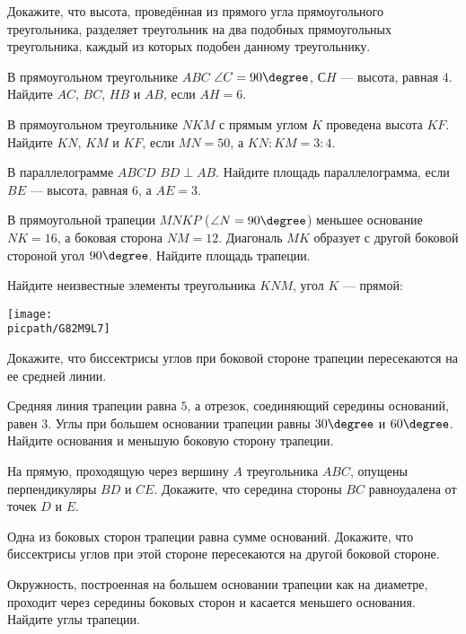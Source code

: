 \begin{class}[number=7]
	\begin{listofex}
		\item Докажите, что высота, проведённая из прямого угла прямоугольного треугольника, разделяет треугольник на два подобных прямоугольных треугольника, каждый из которых подобен данному треугольнику.
		\item В прямоугольном треугольнике \( ABC \) \( \angle C=90\degree \), \( СH \) --- высота, равная \( 4 \). Найдите \( AC \), \( BC \), \( HB \) и \( AB \), если \( AH=6 \).
		\item В прямоугольном треугольнике \( NKM \) с прямым углом \( K \) проведена высота \( KF \). Найдите \( KN \), \( KM \) и \( KF \), если \( MN=50 \), а \( KN:KM=3:4 \).
		\item В параллелограмме \( ABCD \) \( BD\perp AB \). Найдите площадь параллелограмма, если \( BE \) --- высота, равная \( 6 \), а \( AE=3 \).
		\item В прямоугольной трапеции \( MNKP \) (\( \angle N=90\degree \)) меньшее основание \( NK=16 \), а боковая сторона \( NM=12 \). Диагональ \( MK \) образует с другой боковой стороной угол \( 90\degree \). Найдите площадь трапеции.
		\item Найдите неизвестные элементы треугольника \( KNM \), угол \( K \) --- прямой:
		\begin{center}
			\texttt{[image: \\picpath/G82M9L7]}
		\end{center}
	\end{listofex}
\end{class}

\begin{class}[number=8]
	\begin{listofex}
		\item Докажите, что биссектрисы углов при боковой стороне трапеции пересекаются на ее средней линии.
		\item Средняя линия трапеции равна \( 5 \), а отрезок, соединяющий середины оснований, равен \( 3 \). Углы при большем основании трапеции равны \( 30\degree \) и \( 60\degree \). Найдите основания и меньшую боковую сторону трапеции.
		\item На прямую, проходящую через вершину \( A \) треугольника \( ABC \), опущены перпендикуляры \( BD \) и \( CE \). Докажите, что середина стороны \( BC \) равноудалена от точек \( D \) и \( E \).
		\item Одна из боковых сторон трапеции равна сумме оснований. Докажите, что биссектрисы углов при этой стороне пересекаются на другой боковой стороне.
		\item Окружность, построенная на большем основании
		трапеции как на диаметре, проходит через середины боковых сторон и касается меньшего основания. Найдите углы трапеции.
	\end{listofex}
\end{class}
